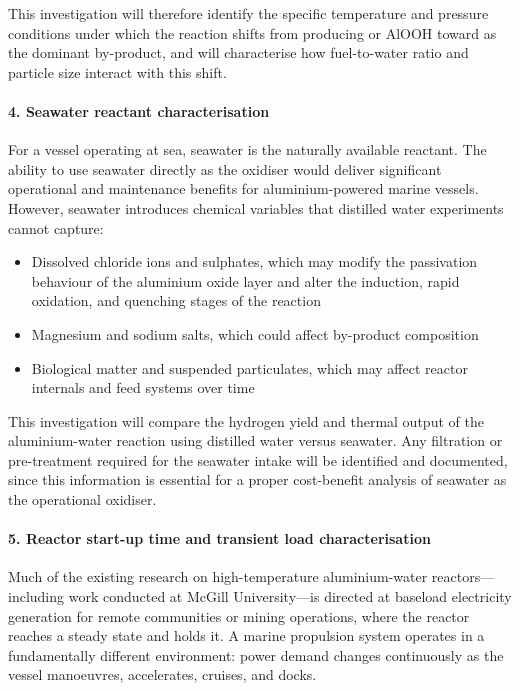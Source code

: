 \documentclass[12pt]{article}
\begin{document}
This investigation will therefore identify the specific temperature and pressure 
conditions under which the reaction shifts from producing  or AlOOH 
toward  as the dominant by-product, and will characterise how 
fuel-to-water ratio and particle size interact with this shift.

\paragraph{4. Seawater reactant characterisation}

For a vessel operating at sea, seawater is the naturally available reactant. The 
ability to use seawater directly as the oxidiser would deliver significant operational 
and maintenance benefits for aluminium-powered marine vessels. However, seawater 
introduces chemical variables that distilled water experiments cannot capture:

\begin{itemize}
    \item Dissolved chloride ions and sulphates, which may modify the passivation 
    behaviour of the aluminium oxide layer and alter the induction, rapid oxidation, 
    and quenching stages of the reaction
    \item Magnesium and sodium salts, which could affect by-product composition
    \item Biological matter and suspended particulates, which may affect reactor 
    internals and feed systems over time
\end{itemize}

This investigation will compare the hydrogen yield and thermal output of the 
aluminium-water reaction using distilled water versus seawater. Any filtration or 
pre-treatment required for the seawater intake will be identified and documented, 
since this information is essential for a proper cost-benefit analysis of seawater 
as the operational oxidiser.

\paragraph{5. Reactor start-up time and transient load characterisation}

Much of the existing research on high-temperature aluminium-water reactors---including 
work conducted at McGill University---is directed at baseload electricity generation 
for remote communities or mining operations, where the reactor reaches a steady state 
and holds it. A marine propulsion system operates in a fundamentally different 
environment: power demand changes continuously as the vessel manoeuvres, accelerates, 
cruises, and docks.
\end{document}
